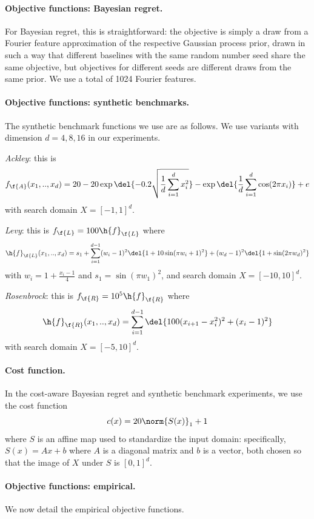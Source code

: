 \documentclass{article}
\begin{document}
\paragraph*{Objective functions: Bayesian regret.}
For Bayesian regret, this is straightforward: the objective is simply a draw from a Fourier feature approximation of the respective Gaussian process prior, drawn in such a way that different baselines with the same random number seed share the same objective, but objectives for different seeds are different draws from the same prior.
We use a total of 1024 Fourier features.

\paragraph*{Objective functions: synthetic benchmarks.}
The synthetic benchmark functions we use are as follows.
We use variants with dimension $d=4, 8, 16$ in our experiments.

\emph{Ackley}: this is  
\[
f_{\f{A}}(x_1,.., x_d) = 20 - 20 \exp\del{-0.2 \sqrt{\frac{1}{d} \sum_{i=1}^d x_i^2}} - \exp\del{\frac{1}{d} \sum_{i=1}^d \cos(2\pi x_i)} + e
\]
with search domain $X=[-1,1]^d$.

\emph{Levy}: this is $f_{\f{L}} = 100 \h{f}_{\f{L}}$ where
\[ 
\h{f}_{\f{L}}(x_1,.., x_d) = s_1 + \sum_{i=1}^{d-1} (w_i - 1)^2 \del{1 + 10 \sin(\pi w_i + 1)^2} + (w_d - 1)^2 \del{1 + \sin(2\pi w_d)^2}
\]
with $w_i = 1 + \frac{x_i - 1}{4}$ and $s_1 = \sin(\pi w_1)^2$, and search domain $X=[-10,10]^d$.

\emph{Rosenbrock}: this is $f_{\f{R}} = 10^5 \h{f}_{\f{R}}$ where
\[
\h{f}_{\f{R}}(x_1,.., x_d) = \sum_{i=1}^{d-1} \del{100 (x_{i+1} - x_i^2)^2 + (x_i - 1)^2}
\]
with search domain $X=[-5,10]^d$.


\paragraph*{Cost function.}
In the cost-aware Bayesian regret and synthetic benchmark experiments, we use the cost function
\[
c(x)=20 \norm{S(x)}_1 + 1  
\]
where $S$ is an affine map used to standardize the input domain: specifically, $S(x) = Ax + b$ where $A$ is a diagonal matrix and $b$ is a vector, both chosen so that the image of $X$ under $S$ is $[0,1]^d$.

\paragraph*{Objective functions: empirical.}
We now detail the empirical objective functions.
\end{document}
